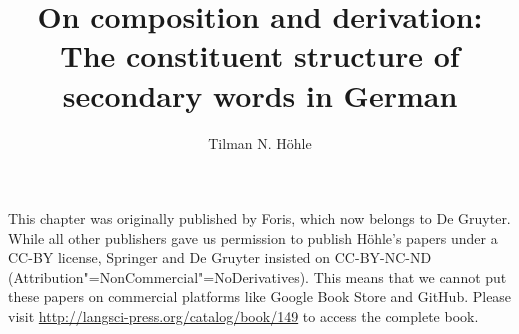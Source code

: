 \documentclass[output=paper]{langsci/langscibook}
\author{Tilman N. Höhle}
\title{On composition and derivation:\newlineCover{} The constituent structure of secondary words in German}
\begin{document}
\label{chap-composition}


\noindent
This chapter was originally published by Foris, which now belongs to De Gruyter. While all other publishers gave us permission to publish Höhle's papers under a CC-BY
license, Springer and De Gruyter insisted on CC-BY-NC-ND (Attribution"=NonCommercial"=No\-De\-riv\-a\-tives).
This means that we cannot put these papers on commercial platforms like Google Book Store and GitHub. Please
visit \url{http://langsci-press.org/catalog/book/149} to access the complete book.








\pagebreak~
\setcounter{page}{278}
\label{chap-composition-end}
\end{document}
